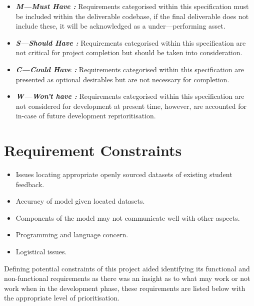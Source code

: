 \begin{itemize}
    \item \textbf{\textit{M---Must Have   :}} Requirements categorised within this specification must be included within the deliverable codebase, if the final deliverable does not include these, it will be acknowledged as a under---performing asset.
    \item \textbf{\textit{S---Should Have :}} Requirements categorised within this specification are not critical for project completion but should be taken into consideration.
    \item \textbf{\textit{C---Could Have  :}} Requirements categorised within this specification are presented as optional desirables but are not necessary for completion.
    \item \textbf{\textit{W---Won't have  :}} Requirements categorised within this specification are not considered for development at present time, however, are accounted for in-case of future development reprioritisation.
\end{itemize}

\section{Requirement Constraints}

\begin{itemize}
    \item Issues locating appropriate openly sourced datasets of existing student feedback.
    \item Accuracy of model given located datasets.
    \item Components of the model may not communicate well with other aspects.
    \item Programming and language concern.
    \item Logistical issues.
\end{itemize}

Defining potential constraints of this project aided identifying its functional and non-functional requirements as there was an insight as to what may work or not work when in the development phase, these requirements are listed below with the appropriate level of prioritisation.



